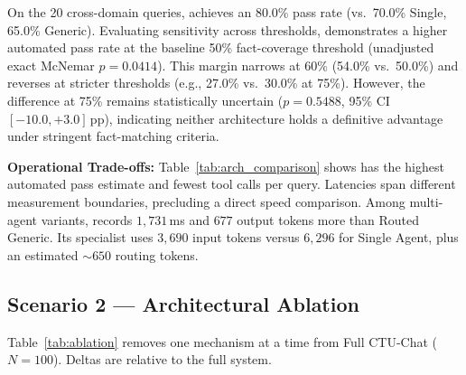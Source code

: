 On the 20 cross-domain queries, \system{} achieves an 80.0\% pass rate (vs.\ 70.0\% Single, 65.0\% Generic). Evaluating sensitivity across thresholds, \system{} demonstrates a higher automated pass rate at the baseline 50\% fact-coverage threshold (unadjusted exact McNemar $p{=}0.0414$). This margin narrows at 60\% (54.0\% vs.\ 50.0\%) and reverses at stricter thresholds (e.g., 27.0\% vs.\ 30.0\% at 75\%). However, the difference at 75\% remains statistically uncertain ($p{=}0.5488$, 95\% CI $[-10.0, +3.0]$\,pp), indicating neither architecture holds a definitive advantage under stringent fact-matching criteria.

\textbf{Operational Trade-offs:}
Table~\ref{tab:arch_comparison} shows \system{} has the highest automated pass estimate and fewest tool calls per query. Latencies span different measurement boundaries, precluding a direct speed comparison. Among multi-agent variants, \system{} records $1{,}731$\,ms and $677$ output tokens more than Routed Generic. Its specialist uses $3{,}690$ input tokens versus $6{,}296$ for Single Agent, plus an estimated ${\sim}650$ routing tokens.

\subsection{Scenario 2 --- Architectural Ablation}
\label{sec:s2_results}

Table~\ref{tab:ablation} removes one mechanism at a time from Full CTU-Chat ($N{=}100$). Deltas are relative to the full system.

